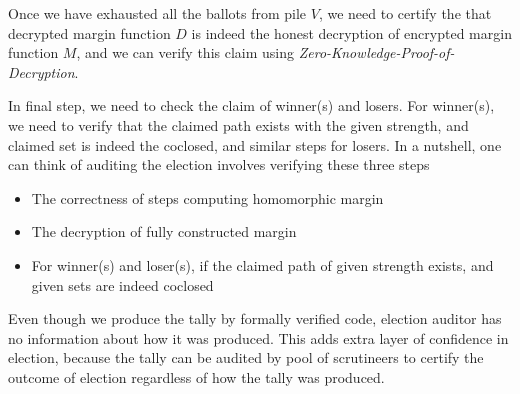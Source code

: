\documentclass{llncs}
\begin{document}
 Once we have exhausted all the ballots from pile $V$, we 
 need to certify the that decrypted margin function $D$ is indeed the 
 honest decryption of encrypted margin function $M$, and we can 
 verify this claim using \textit{Zero-Knowledge-Proof-of-Decryption}.
 
 In final step, we need to check the claim of winner(s) and losers. 
 For winner(s), we need to verify that the claimed path exists with 
 the given strength, and claimed set is indeed the coclosed, and similar
 steps for losers. In a nutshell, one can 
think of auditing the election involves verifying these three steps
\begin{itemize}
 \item The correctness of steps computing homomorphic margin 
 \item The decryption of fully constructed margin
 \item For winner(s) and loser(s), 
       if the claimed path of given strength exists, and given sets are 
       indeed coclosed 
\end{itemize} 

Even though we produce the tally by formally verified code, election 
auditor has no information about how it was produced. This adds extra layer
of confidence in election, because the tally can be audited by pool
of scrutineers to certify the outcome of election regardless of how the tally 
was produced.
\end{document}
